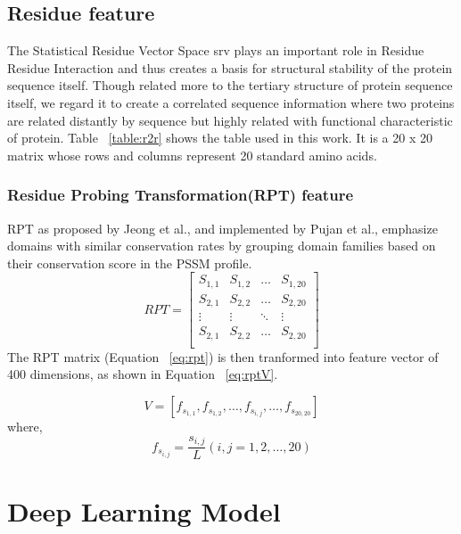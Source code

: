 \subsection{Residue feature} 
The Statistical Residue Vector Space \acrshort{srv} \cite{Wong2018} plays an important role in Residue Residue Interaction and thus creates a basis for structural stability of the protein sequence itself. Though related more to the tertiary structure of protein sequence itself, we regard it to create a correlated sequence information where two proteins are related distantly by sequence but highly related with functional characteristic of protein. Table ~\ref{table:r2r} shows the table used in this work. It is a 20 x 20 matrix whose rows and columns represent 20 standard amino acids.

\subsubsection{Residue Probing Transformation(RPT) feature}
RPT as proposed by Jeong et al.\cite{Jeong2011}, and implemented by Pujan et al.\cite{Mishra2019}, emphasize domains with similar conservation rates by grouping domain families based on their conservation score in the PSSM profile.
\begin{equation}
  RPT = \begin{bmatrix}
    S_{1,1} & S_{1,2} & \dots & S_{1,20} \\
    S_{2,1} & S_{2,2} & \dots & S_{2,20} \\
    \vdots  & \vdots  & \ddots & \vdots \\
    S_{2,1} & S_{2,2} & \dots & S_{2,20} \\
  \end{bmatrix}
  \label{eq:rpt}
\end{equation}
The RPT matrix (Equation ~\ref{eq:rpt}) is then tranformed into feature vector of 400 dimensions, as shown in Equation ~\ref{eq:rptV}.

\begin{equation}
  V = [ f_{s_{1,1}}, f_{s_{1,2}}, \dots, f_{s_{i,j}}, \dots, f_{s_{20,20}} ]
  \label{eq:rptV}
\end{equation}
where, 
\begin{equation}
  f_{s_{i,j}} = \frac{s_{i,j}}{L} (i,j = 1,2,\dots,20)
  \label{eq:rptF}
\end{equation}


\section{Deep Learning Model}

